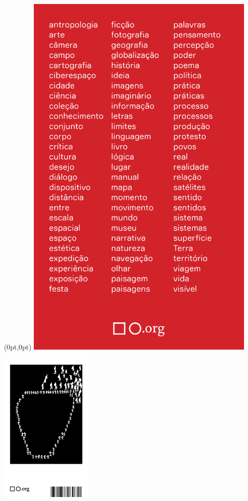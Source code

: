 \pagestyle{quadrado}
\label{quadrado}

\begin{textblock*}{5.625in}(0pt,0pt)%
\vspace*{-1.45cm}
\hspace*{-1.8cm}\includegraphics*[width=112mm]{./imgs/QUADRADO.png}
\end{textblock*}

\pagebreak

\hspace{.5cm}

\begin{center}
\hspace*{-2.5cm}
\hspace*{2cm}\includegraphics[width=45mm]{./imgs/fuga.png}
\end{center}


